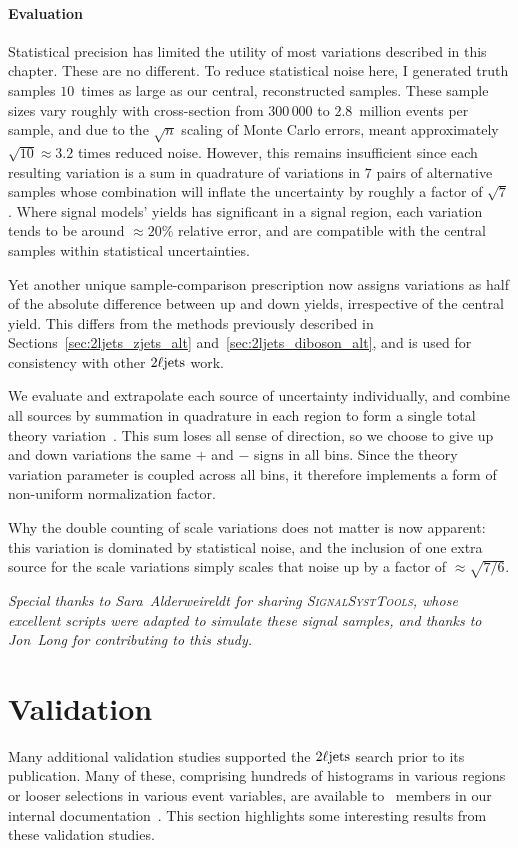 \paragraph{Evaluation}
Statistical precision has limited the utility of most variations described in
this chapter.
These are no different.
To reduce statistical noise here, I generated truth samples $10$~times as large
as our central, reconstructed samples.
These sample sizes vary roughly with cross-section from $300\,000$ to
$2.8$~million events per sample, and due to the $\sqrt{n}$ scaling of
Monte Carlo errors, meant approximately $\sqrt{10}\approx 3.2$ times reduced
noise.
However, this remains insufficient since each resulting variation is a
sum in quadrature of variations in $7$ pairs of alternative samples
whose combination will inflate the uncertainty by roughly a factor of
$\sqrt{7}$.
Where signal models' yields has significant in a signal region,
each variation tends to be around $\approx 20\%$ relative error,
and are compatible with the central samples within statistical uncertainties.

Yet another unique sample-comparison prescription now assigns variations as
half of the absolute difference between up and down yields, irrespective of the
central yield.
This differs from the methods previously described in
Sections~\ref{sec:2ljets_zjets_alt} and~\ref{sec:2ljets_diboson_alt},
and is used for consistency with other $2\ell\mathrm{jets}$ work.

We evaluate and extrapolate each source of uncertainty individually,
and combine all sources by summation in quadrature in each region to form a
single total theory variation~\cite{atlas_twiki_susytheoretical}.
This sum loses all sense of direction, so we choose to give up and down
variations the same $+$ and $-$ signs in all bins.
Since the theory variation parameter is coupled across all bins, it therefore
implements a form of non-uniform normalization factor.

Why the double counting of scale variations does not matter is now apparent:
this variation is dominated by statistical noise, and the inclusion of one
extra source for the scale variations simply scales that noise up by
a factor of $\approx \sqrt{7/6}$.

\emph{%
Special thanks to Sara~Alderweireldt for sharing \textsc{SignalSystTools},
whose excellent scripts were adapted to simulate these signal
samples, and thanks to Jon~Long for contributing to this study.
}

\section{Validation}
\label{sec:2ljets_validation}
Many additional validation studies supported the $2\ell\mathrm{jets}$ search prior to
its publication.
Many of these, comprising hundreds of histograms in various regions or looser
selections in various event variables, are available to \atlas\ members in
our internal documentation~\cite{twoljets2018int}.
This section highlights some interesting results from these validation studies.

